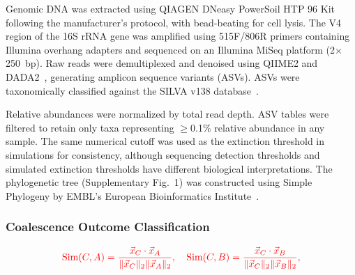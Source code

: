 Genomic DNA was extracted using QIAGEN DNeasy PowerSoil HTP 96 Kit following the manufacturer's protocol, with bead-beating for cell lysis. The V4 region of the 16S rRNA gene was amplified using 515F/806R primers containing Illumina overhang adapters and sequenced on an Illumina MiSeq platform (2$\times$250~bp). Raw reads were demultiplexed and denoised using QIIME2 and DADA2~\citep{Callahan2016}, generating amplicon sequence variants (ASVs). ASVs were taxonomically classified against the SILVA v138 database~\citep{Quast2013}.

Relative abundances were normalized by total read depth. ASV tables were filtered to retain only taxa representing $\geq$0.1\% relative abundance in any sample. The same numerical cutoff was used as the extinction threshold in simulations for consistency, although sequencing detection thresholds and simulated extinction thresholds have different biological interpretations. The phylogenetic tree (Supplementary Fig.~1) was constructed using Simple Phylogeny by EMBL's European Bioinformatics Institute~\citep{Madeira2022}.


\subsubsection*{Coalescence Outcome Classification}
\label{sec:suppl:methods:classification}

\begin{equation}
\textcolor{red}{\text{Sim}(C, A) = \frac{\vec{x}_C \cdot \vec{x}_A}{\|\vec{x}_C\|_2 \|\vec{x}_A\|_2}, \quad
\text{Sim}(C, B) = \frac{\vec{x}_C \cdot \vec{x}_B}{\|\vec{x}_C\|_2 \|\vec{x}_B\|_2},}
\end{equation}

